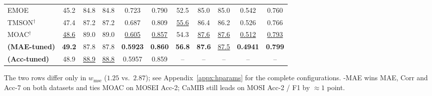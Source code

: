 \begin{table}[t]
{\begin{tabular}{l|ccccc|ccccc}
EMOE~\citep{emoe2024}                  & 45.2 & 84.8 & 84.8 & 0.723 & 0.790 & 52.5 & 85.0 & 85.0 & 0.542 & 0.760 \\
TMSON$^{\dagger}$~\citep{tmson2024}    & 47.4 & 87.2 & 87.2 & 0.687 & 0.809 & \underline{55.6} & 86.4 & 86.2 & 0.526 & 0.766 \\
MOAC$^{\dagger}$~\citep{moac2025}      & \underline{48.6} & 89.0 & 89.0 & \underline{0.605} & \underline{0.857} & 54.3 & \underline{87.6} & \underline{87.6} & \underline{0.512} & \underline{0.793} \\
\midrule
\textbf{\methodname{} (MAE-tuned)}     & \textbf{49.2} & 87.8 & 87.8 & \textbf{0.5923} & \textbf{0.860} & \textbf{56.8} & \textbf{87.6} & \underline{87.5} & \textbf{0.4941} & \textbf{0.799} \\
\textbf{\methodname{} (Acc-tuned)}     & 48.9 & \underline{88.9} & \underline{88.8} & 0.5957 & 0.859 & -- & -- & -- & -- & -- \\
\bottomrule
\end{tabular}}

\smallskip
\footnotesize{The two \methodname{} rows differ only in
$w_{\mathrm{mse}}$ ($1.25$ vs.\ $2.87$); see Appendix~\ref{appx:hparams}
for the complete configurations. \methodname{}-MAE wins MAE, Corr and
Acc-7 on both datasets and ties MOAC on MOSEI Acc-2; CaMIB still leads
on MOSI Acc-2 / F1 by $\approx\!1$ point.}
\end{table}
